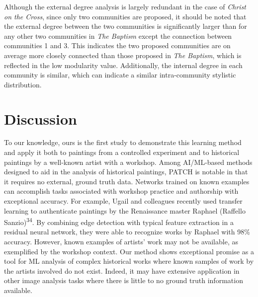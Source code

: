 \documentclass[11pt]{article}
\begin{document}
Although the external degree analysis is largely redundant in the case
of \emph{Christ on the Cross}, since only two communities
are proposed, it should be noted that the external degree between the
two communities is significantly larger than for any other two
communities in \emph{The Baptism} except the connection between communities 1
and 3. This indicates the two proposed communities are on average more
closely connected than those proposed in \emph{The Baptism}, which is reflected
in the low modularity value. Additionally, the internal degree in each
community is similar, which can indicate a similar intra-community
stylistic distribution.

\section*{Discussion}

To our knowledge, ours is the first study to demonstrate this learning
method and apply it both to paintings from a controlled experiment and
to historical paintings by a well-known artist with a workshop. Among
AI/ML-based methods designed to aid in the analysis of historical
paintings, PATCH is notable in that it requires no external, ground
truth data. Networks trained on known examples can accomplish tasks
associated with workshop practice and authorship with exceptional
accuracy. For example, Ugail and colleagues recently used transfer
learning to authenticate paintings by the Renaissance master Raphael
(Raffello Sanzio)\textsuperscript{34}. By combining edge detection with
typical feature extraction in a residual neural network, they were able
to recognize works by Raphael with 98\% accuracy. However, known
examples of artists' work may not be available, as exemplified by the
workshop context. Our method shows exceptional promise as a tool for ML
analysis of complex historical works where known samples of work by the
artists involved do not exist. Indeed, it may have extensive application
in other image analysis tasks where there is little to no ground truth
information available.
\end{document}
